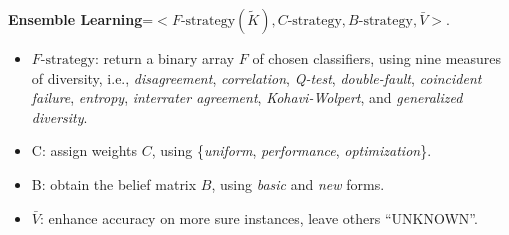 {\bf Ensemble Learning}=$<F\text{-strategy}(\tilde{K}), C\text{-strategy}, B\text{-strategy}, \bar{V}>$.


\begin{itemize}[noitemsep,topsep=1pt]
  \itemsep0.35em 
  \item $F\text{-strategy}$: return a binary array $F$ of chosen classifiers,  using nine measures of diversity, i.e., \emph{disagreement}, \emph{correlation}, \emph{Q-test}, \emph{double-fault}, \emph{coincident failure}, \emph{entropy}, \emph{interrater agreement}, \emph{Kohavi-Wolpert}, and \emph{generalized diversity}. 
  \item C: assign weights $C$, using \{\emph{uniform}, \emph{performance}, \emph{optimization}\}.
  \item B: obtain the belief matrix $B$, using \emph{basic} and \emph{new} forms.
  \item $\bar{V}$: enhance accuracy on more sure instances, leave others ``UNKNOWN''.
\end{itemize}

